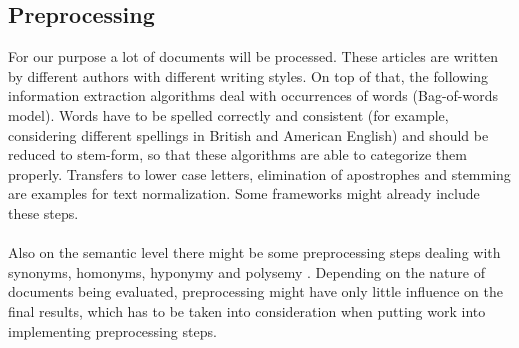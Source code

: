 \subsection{Preprocessing}

For our purpose a lot of documents will be processed. These articles are written by different authors with different writing styles. On top of that, the following information extraction algorithms deal with occurrences of words (Bag-of-words model). Words have to be spelled correctly and consistent (for example, considering different spellings in British and American English) and should be reduced to stem-form, so that these algorithms are able to categorize them properly. Transfers to lower case letters, elimination of apostrophes and stemming are examples for text normalization. Some frameworks might already include these steps. \cite{Grobelnik}
\\
\\
Also on the semantic level there might be some preprocessing steps dealing with synonyms, homonyms, hyponymy and polysemy \cite{Grobelnik}. Depending on the nature of documents being evaluated, preprocessing might have only little influence on the final results, which has to be taken into consideration when putting work into implementing preprocessing steps.